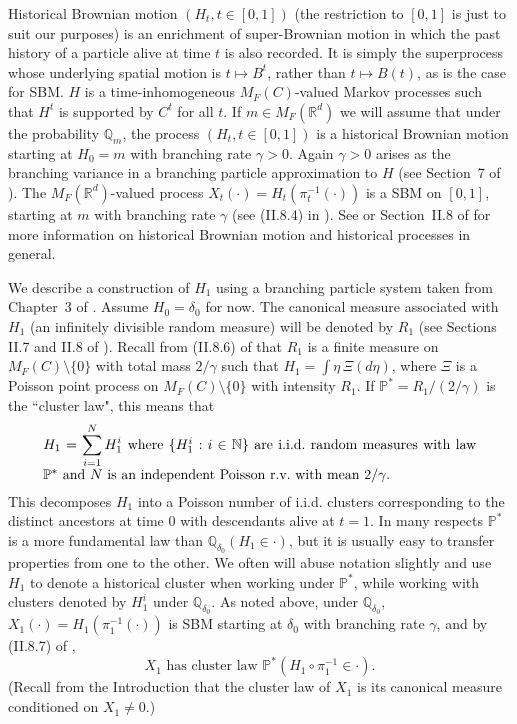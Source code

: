 \documentclass[12pt]{article}
\numberwithin{theorem}{section}
\theoremstyle{def}
\numberwithin{equation}{section}
\renewcommand{\P}{\mathbb{P}}
\newcommand{\R}{\mathbb{R}}
\newcommand{\Q}{\mathbb{Q}}
\newcommand{\N}{\mathbb{N}}
\begin{document}
Historical Brownian motion $(H_t,t\in[0,1])$ (the restriction to $[0,1]$ is just to suit our purposes) is an enrichment of super-Brownian motion in which the past history of a particle alive at time $t$ is also recorded.  It is simply the superprocess whose underlying spatial motion is $t\mapsto B^t$, rather than $t\mapsto B(t)$, as is the case for SBM.  $H$ is a time-inhomogeneous $M_F(C)$-valued Markov processes such that $H^t$ is supported by $C^t$ for all $t$.  
If $m\in M_F(\R^d)$ we will assume that under the probability $\Q_m$, the process $(H_t,t\in[0,1])$ is a historical Brownian motion starting at $H_0=m$ with branching rate $\gamma>0$.  
Again $\gamma>0$ arises as the branching variance in a branching particle approximation to $H$ (see Section~7 of \cite{DP91}).
The $M_F(\R^d)$-valued process $X_t(\cdot)=H_t(\pi_t^{-1}(\cdot))$ is a SBM on $[0,1]$, starting at $m$ with branching rate $\gamma$ (see (II.8.4) in \cite{Per02}). See \cite{DP91} or Section~II.8 of \cite{Per02} for more information on historical Brownian motion and historical processes in general. 

We describe a construction of $H_1$ using a branching particle system taken from Chapter~3 of \cite{DP91}. Assume $H_0=\delta_0$ for now.  The canonical measure associated with $H_1$ (an infinitely divisible random measure) will be denoted by $R_1$ (see Sections II.7 and II.8 of \cite{Per02}).  Recall from (II.8.6) of \cite{Per02} that $R_1$ is a finite measure on $M_F(C)\setminus\{0\}$ with total mass $2/\gamma$ such that $H_1=\int\eta \, \Xi(d\eta)$, where $\Xi$ is a Poisson point process on $M_F(C)\setminus\{0\}$ with intensity $R_1$. If $\P^*=R_1/(2/\gamma)$ is the ``cluster law", this means that 
\begin{equation}\label{Poisdec}
	\parbox[t]{0.9\textwidth}{$\displaystyle H_1=\sum_{i=1}^NH^i_1$ where $\{H^i_1:i \in\N\}$ are i.i.d.\ random measures with law $\P^*$ and $N$ is an independent Poisson r.v.\ with mean $2/\gamma.$}
\end{equation}
This decomposes $H_1$ into a Poisson number of i.i.d. clusters corresponding to the distinct ancestors at time $0$ with descendants alive at $t=1$.  In many respects $\P^*$ is a more fundamental law than $\Q_{\delta_0}(H_1\in\cdot)$, but it is usually easy to transfer properties from one to the other.  We often will abuse notation slightly and use $H_1$ to denote a historical cluster when working under $\P^*$, while working with clusters denoted by $H^i_1$ under $\Q_{\delta_0}$. As noted above, under $\Q_{\delta_0}$, $X_1(\cdot)=H_1(\pi_1^{-1}(\cdot))$ is SBM starting at $\delta_0$ with branching rate $\gamma$, and by (II.8.7) of \cite{Per02}, 
\begin{equation}\label{SBMcluster}
\text{$X_1$ has cluster law $\P^*(H_1\circ\pi_1^{-1}\in\cdot)$.}
\end{equation}
 (Recall from the Introduction that the cluster law of $X_1$ is its canonical measure conditioned on $X_1\neq 0$.)%
\end{document}
